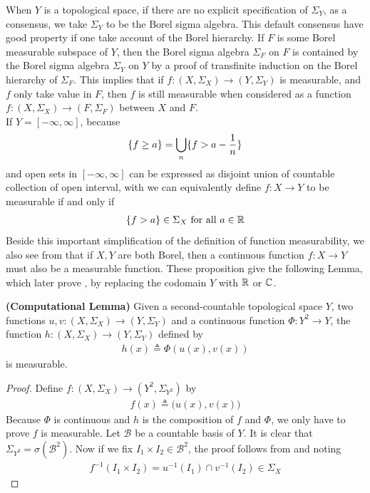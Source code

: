 \documentclass{report}
\begin{document}
\begin{mdframed}
When $Y$ is a topological space, if there are no explicit specification of $\Sigma_Y$, as a consensus, we take $\Sigma_Y$ to be the Borel sigma algebra. This default consensus have good property if one take account of the Borel hierarchy. If $F$ is some Borel measurable subspace of $Y$, then the Borel sigma algebra $\Sigma_F$ on $F$ is contained by the Borel sigma algebra $\Sigma_Y$ on $Y$ by a proof of transfinite induction on the Borel hierarchy of  $\Sigma_F$. This implies that if $f:(X,\Sigma_X)\rightarrow (Y,\Sigma_Y)$ is measurable, and $f$ only take value in $F$, then $f$ is still measurable when considered as a function $f:(X,\Sigma_X)\rightarrow (F,\Sigma_F)$ between $X$ and  $F$. \\

If $Y=[-\infty,\infty]$, because 
\begin{align*}
  \{ f\geq  a \}= \bigcup_n \{ f > a-\frac{1}{n} \}
\end{align*}
and open sets in $[-\infty,\infty]$ can be expressed as disjoint union of countable collection of open interval, with  we can equivalently define $f:X\rightarrow Y$ to be  measurable if and only if 
\begin{align*}
\{ f>a \}\in \Sigma_X \text{ for all }a\in\mathbb{R}
\end{align*}
Beside this important simplification of the definition of function measurability, we also see from  that if $X,Y$ are both Borel, then a continuous function  $f:X\rightarrow Y$ must also be a measurable function. These proposition give the following Lemma, which later prove , by replacing the codomain $Y$ with $\mathbb{R}$ or $\mathbb{C}$. 






\end{mdframed}
\begin{lemma}
\label{CL}
\textbf{(Computational Lemma)} Given a second-countable topological space $Y$, two functions $u,v:(X,\Sigma_X)\rightarrow (Y,\Sigma_Y)$ and a continuous function $\Phi:Y^2 \rightarrow Y$, the function $h:(X,\Sigma_X)\rightarrow (Y,\Sigma_Y)$ defined by
\begin{align*}
h(x)\triangleq \Phi(u(x),v(x))
\end{align*}
is measurable. 
\end{lemma}
\begin{proof}
  Define $f:(X,\Sigma_X)\rightarrow (Y^2,\Sigma_{Y^2})$ by 
\begin{align*}
f(x)\triangleq \big(u(x),v(x) \big)
\end{align*}
Because $\Phi$ is continuous and $h$ is the composition of $f$ and $\Phi$, we only have to prove $f$ is measurable. Let $\mathcal{B}$ be a countable basis of $Y$. It is clear that $\Sigma_{Y^2}=\sigma (\mathcal{B}^2)$. Now if we fix $I_1\times I_2 \in \mathcal{B}^2$, the proof follows from  and noting 
\begin{align*}
f^{-1}(I_1\times I_2)=u^{-1}(I_1)\cap v^{-1}(I_2) \in \Sigma_X \end{align*}
\end{proof}
\end{document}
